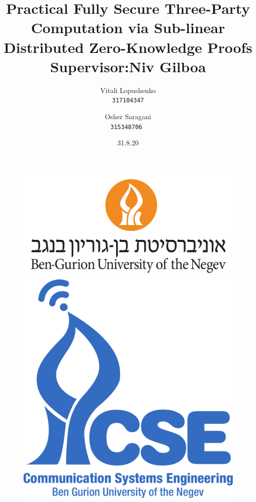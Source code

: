 \documentclass[12pt]{article}
\title{\textbf{Practical Fully Secure Three-Party Computation via Sub-linear Distributed Zero-Knowledge Proofs} \break\break Supervisor:\break Niv Gilboa \break}
\author{  Vitali Lopushenko\\
	\texttt{317104347}
	\and
	Osher Saragani\\
	\texttt{315348706}\
	\date{31.8.20}
	}
\begin{document}
\begin{figure}
	\begin{minipage}[c]{0.6\linewidth}
		\includegraphics[width=\linewidth]{"../Figures/BGU-logo.png"}
	\end{minipage}
	\hfill
	\begin{minipage}[c]{0.3\linewidth}
		\includegraphics[width=\linewidth]{"../Figures/cse_logo.png"}
	\end{minipage}%
\end{figure}

\maketitle
\pagebreak
\tableofcontents
\pagebreak
\listoffigures
\listoftables
\pagebreak
\end{document}
